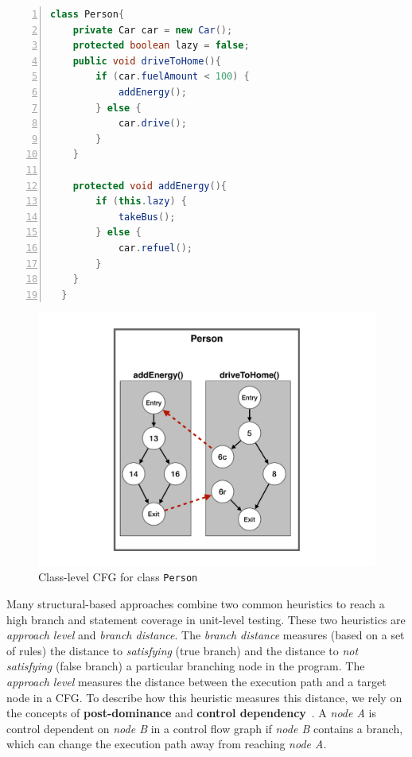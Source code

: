 \begin{lstlisting}[frame=tb,
    caption={Class \texttt{Person}},
    label=list:ClassA,
    language=java,
    captionpos=t,
    numbers=left,
    belowskip=-2.5em,
    float=t,
    firstnumber=1]
class Person{
    private Car car = new Car();
    protected boolean lazy = false;
    public void driveToHome(){
        if (car.fuelAmount < 100) {
            addEnergy();
        } else {
            car.drive();
        }   
    }

    protected void addEnergy(){
        if (this.lazy) {
            takeBus();
        } else {
            car.refuel();
        }
    }   
  }
  \end{lstlisting}

  \begin{figure}[t]
    \centering
	\includegraphics[width=0.85\linewidth]{figs/CCFG_new}
	\caption{Class-level CFG for class \texttt{Person}}
  \label{fig:CCFG}
\end{figure}


Many structural-based approaches combine two common heuristics to reach a high branch and statement coverage in unit-level testing. These two heuristics  are \textit{approach level} and \textit{branch distance}.
The \textit{branch distance} measures (based on a set of rules) the distance to \textit{satisfying} (true branch) and the distance to \textit{not satisfying} (false branch) a particular branching node in the program.
The \textit{approach level} measures the distance between the execution path and a target node in a CFG. To describe how this heuristic measures this distance, we 
rely on the concepts of \textbf{post-dominance} and \textbf{control dependency}~\cite{Allen:1970:CFA:800028.808479}. A \textit{node A} is control dependent on \textit{node B} in a control flow graph if \textit{node B} contains a branch, which can change the execution path away from reaching \textit{node A}.


